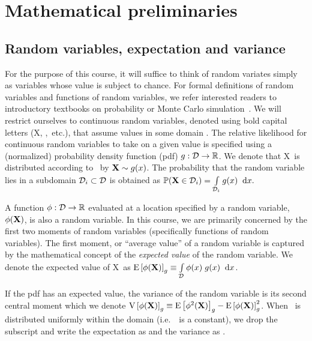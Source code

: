 \chapter{Mathematical preliminaries}


\section{Random variables, expectation and variance}
For the purpose of this course, it will suffice to think of random variates simply as variables whose value is subject to chance. 
 For formal definitions of random variables and functions of random variables, we refer interested readers to introductory textbooks on probability or Monte Carlo simulation~\cite{robertc10}.
 We will restrict ourselves to continuous random variables, denoted using bold capital letters (\RV X, \yii,~etc.), that assume values in some domain \Dom. 
 The relative likelihood for continuous random variables to take on a given value is specified using a (normalized) probability density function (pdf) $g: \mathcal{D} \rightarrow \mathbb{R}$. We denote that \RV X\ is distributed according to \sdn\ by $\mathbf{X} \sim g(x)$. The probability that the random variable lies in a subdomain $\mathcal{D}_{i} \subset \mathcal{D}$ is obtained as 
  $\mathbb{P}(\mathbf{X} \in \mathcal{D}_{i}) = \int\limits_{\mathcal{D}_{i}}^{} g(x) \;\; \mathrm{d}x.$

A function $\phi:\mathcal{D}\rightarrow\mathbb{R}$ evaluated at a location specified by a random variable, $\phi(\mathbf{X})$, is also a random variable.
In this course, we are primarily concerned by the first two moments of random variables (specifically functions of random variables). The first moment, or ``average value'' of a random variable is captured by the mathematical concept of the \textit{expected value} of the random variable. We denote the expected value of \RV X\ as 
$ \mathrm{E} \left[\phi(\mathbf{X}) \right]_{g}   \equiv \int\limits_{\mathcal{D}}^{} \phi(x)\;g(x) \;\; \mathrm{d}x$. 

If the pdf has an expected value, the variance of the random variable is its second central moment which we denote
$\mathrm{V} \left[\phi(\mathbf{X})\right]_{g} \equiv \mathrm{E} \left[\phi^2(\mathbf{X}) \right]_{g} - \mathrm{E} \left[\phi(\mathbf{X}) \right]_{g}^2$. 
When \ is distributed uniformly within the domain (i.e.~\sdn\ is a constant), we drop the subscript and write the expectation as  and the variance as .

